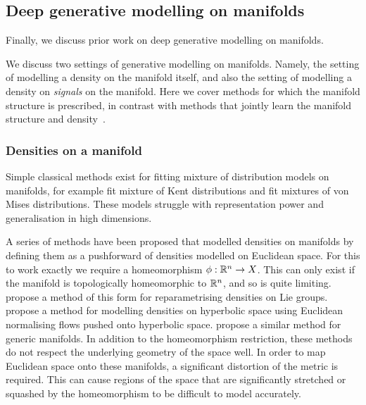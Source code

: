 \subsection{Deep generative modelling on manifolds}

Finally, we discuss prior work on deep generative modelling on manifolds.

We discuss two settings of generative modelling on manifolds.
Namely, the setting of modelling a density on the manifold itself, and also the setting of modelling a density on \emph{signals} on the manifold.
Here we cover methods for which the manifold structure is prescribed, in contrast with methods that jointly learn the manifold structure and density~\parencite[e.g.][]{brehmer2020flows,caterini2021Rectangular}.

\subsubsection{Densities on a manifold}

Simple classical methods exist for fitting mixture of distribution models on manifolds, for example \cite{peel2001fitting} fit mixture of Kent distributions and \textcite{mardia2007protein} fit mixtures of von Mises distributions.
These models struggle with representation power and generalisation in high dimensions.

A series of methods have been proposed that modelled densities on manifolds by defining them as a pushforward of densities modelled on Euclidean space.
For this to work exactly we require a homeomorphism \(\phi: \mathbb{R}^n \to X\).
This can only exist if the manifold is topologically homeomorphic to \(\mathbb{R}^n\), and so is quite limiting.
\textcite{falorsi2019reparameterizing} propose a method of this form for reparametrising densities on Lie groups.
\textcite{bose2020latent} propose a method for modelling densities on hyperbolic space using Euclidean normalising flows pushed onto hyperbolic space.
\textcite{gemici2016normalizing} propose a similar method for generic manifolds.
In addition to the homeomorphism restriction, these methods do not respect the underlying geometry of the space well.
In order to map Euclidean space onto these manifolds, a significant distortion of the metric is required.
This can cause regions of the space that are significantly stretched or squashed by the homeomorphism to be difficult to model accurately.

